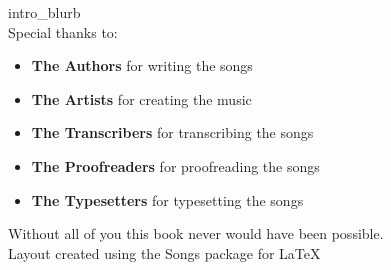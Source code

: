 \vspace*{\baselineskip}

{{intro_blurb}}
\\
Special thanks to:\\
\begin{itemize}
  \item \textbf{The Authors} for writing the songs
  \item \textbf{The Artists} for creating the music
  \item \textbf{The Transcribers} for transcribing the songs
  \item \textbf{The Proofreaders} for proofreading the songs
  \item \textbf{The Typesetters} for typesetting the songs

\end{itemize}
Without all of you this book never would have been possible. \\

Layout created using the Songs package for \LaTeX
\\
\\

\clearpage

